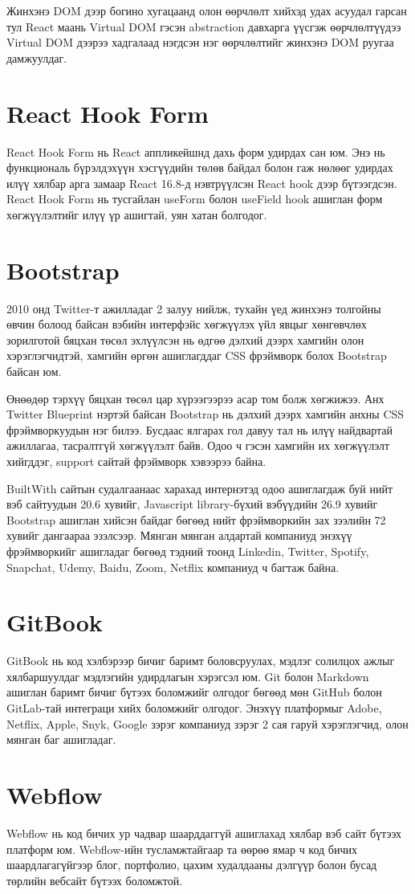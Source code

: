 Жинхэнэ DOM дээр богино хугацаанд олон өөрчлөлт хийхэд удах асуудал гарсан тул React маань Virtual DOM гэсэн abstraction давхарга үүсгэж өөрчлөлтүүдээ Virtual DOM дээрээ хадгалаад нэгдсэн нэг өөрчлөлтийг жинхэнэ DOM руугаа дамжуулдаг.

\section{React Hook Form}
React Hook Form нь React аппликейшнд дахь форм удирдах сан юм. Энэ нь функциональ бүрэлдэхүүн хэсгүүдийн төлөв байдал болон гаж нөлөөг удирдах илүү хялбар арга замаар React 16.8-д нэвтрүүлсэн React hook дээр бүтээгдсэн. React Hook Form нь тусгайлан useForm болон useField hook ашиглан форм хөгжүүлэлтийг илүү үр ашигтай, уян хатан болгодог.

\section{Bootstrap}
2010 онд Twitter-т ажилладаг 2 залуу нийлж, тухайн үед жинхэнэ толгойны өвчин болоод байсан вэбийн интерфэйс хөгжүүлэх үйл явцыг хөнгөвчлөх зорилготой бяцхан төсөл эхлүүлсэн нь өдгөө дэлхий дээрх хамгийн олон хэрэглэгчидтэй, хамгийн өргөн ашиглагддаг CSS фрэймворк болох Bootstrap байсан юм.

Өнөөдөр тэрхүү бяцхан төсөл цар хүрээгээрээ асар том болж хөгжижээ. Анх Twitter Blueprint нэртэй байсан Bootstrap нь дэлхий дээрх хамгийн анхны CSS фрэймворкуудын нэг билээ. Бусдаас ялгарах гол давуу тал нь илүү найдвартай ажиллагаа, тасралтгүй хөгжүүлэлт байв. Одоо ч гэсэн хамгийн их хөгжүүлэлт хийгддэг, support сайтай фрэймворк хэвээрээ байна.

BuiltWith сайтын судалгаанаас харахад интернэтэд одоо ашиглагдаж буй нийт вэб сайтуудын 20.6 хувийг, Javascript library-бүхий вэбүүдийн 26.9 хувийг Bootstrap ашиглан хийсэн байдаг бөгөөд нийт фрэймворкийн зах зээлийн 72 хувийг дангаараа эзэлсээр. Мянган мянган алдартай компаниуд энэхүү фрэймворкийг ашигладаг бөгөөд тэдний тоонд Linkedin, Twitter, Spotify, Snapchat, Udemy, Baidu, Zoom, Netflix компаниуд ч багтаж байна.

\section{GitBook}
GitBook нь код хэлбэрээр бичиг баримт боловсруулах, мэдлэг солилцох ажлыг хялбаршуулдаг мэдлэгийн удирдлагын хэрэгсэл юм. Git болон Markdown ашиглан баримт бичиг бүтээх боломжийг олгодог бөгөөд мөн GitHub болон GitLab-тай интеграци хийх боломжийг олгодог. Энэхүү платформыг Adobe, Netflix, Apple, Snyk, Google зэрэг компаниуд зэрэг 2 сая гаруй хэрэглэгчид, олон мянган баг ашигладаг.

\section{Webflow}
Webflow нь код бичих ур чадвар шаарддаггүй ашиглахад хялбар вэб сайт бүтээх платформ юм. Webflow-ийн тусламжтайгаар та өөрөө ямар ч код бичих шаардлагагүйгээр блог, портфолио, цахим худалдааны дэлгүүр болон бусад төрлийн вебсайт бүтээх боломжтой.